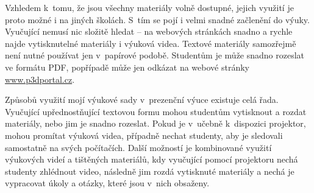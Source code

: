 Vzhledem k~tomu, že jsou všechny materiály volně dostupné, jejich využití je proto možné i na jiných školách.
S~tím se pojí i velmi snadné začlenění do výuky.
Vyučující nemusí nic složitě hledat -- na webových stránkách snadno a rychle najde vytisknutelné materiály i výuková videa.
Textové materiály samozřejmě není nutné používat jen v~papírové podobě. Studentům je může snadno rozeslat ve formátu PDF, popřípadě může jen odkázat na webové stránky \href{https://www.p3dportal.cz}{www.p3dportal.cz}.

Způsobů využití mojí výukové sady v~prezenční výuce existuje celá řada.
Vyučující upřednostňující textovou formu mohou studentům vytisknout a rozdat materiály, nebo jim je snadno rozeslat.
Pokud je v~učebně k~dispozici projektor, mohou promítat výuková videa, případně nechat studenty, aby je sledovali samostatně na svých počítačích.
Další možností je kombinované využití výukových videí a tištěných materiálů, kdy vyučující pomocí projektoru nechá studenty zhlédnout video, následně jim rozdá vytisknuté materiály a nechá je vypracovat úkoly a otázky, které jsou v~nich obsaženy.
